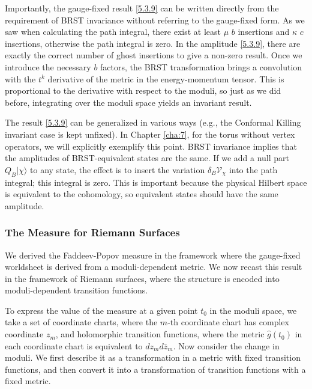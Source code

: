 Importantly, the gauge-fixed result \eqref{5.3.9} can be written directly from the requirement of BRST invariance without referring to the gauge-fixed form. As we saw when calculating the path integral, there exist at least $\mu$ $b$ insertions and $\kappa$ $c$ insertions, otherwise the path integral is zero. In the amplitude \eqref{5.3.9}, there are exactly the correct number of ghost insertions to give a non-zero result. Once we introduce the necessary $b$ factors, the BRST transformation brings a convolution with the $t^{k}$ derivative of the metric in the energy-momentum tensor. This is proportional to the derivative with respect to the moduli, so just as we did before, integrating over the moduli space yields an invariant result.

The result \eqref{5.3.9} can be generalized in various ways (e.g., the Conformal Killing invariant case is kept unfixed). In Chapter \ref{cha:7}, for the torus without vertex operators, we will explicitly exemplify this point. BRST invariance implies that the amplitudes of BRST-equivalent states are the same. If we add a null part $Q_{B}|\chi\rangle$ to any state, the effect is to insert the variation $\delta_{B} \mathscr{V}_{\chi}$ into the path integral; this integral is zero. This is important because the physical Hilbert space is equivalent to the cohomology, so equivalent states should have the same amplitude.

\subsubsection*{\Large The Measure for Riemann Surfaces}
We derived the Faddeev-Popov measure in the framework where the gauge-fixed worldsheet is derived from a moduli-dependent metric. We now recast this result in the framework of Riemann surfaces, where the structure is encoded into moduli-dependent transition functions.

To express the value of the measure at a given point $t_{0}$ in the moduli space, we take a set of coordinate charts, where the $m$-th coordinate chart has complex coordinate $z_{m}$, and holomorphic transition functions, where the metric $\hat{g}\left(t_{0}\right)$ in each coordinate chart is equivalent to $d z_{m} d \bar{z}_{m}$. Now consider the change in moduli. We first describe it as a transformation in a metric with fixed transition functions, and then convert it into a transformation of transition functions with a fixed metric.

